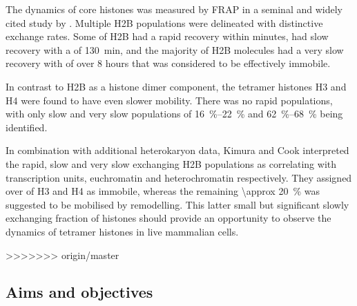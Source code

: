 
    The dynamics of core histones was measured by FRAP in a seminal
    and widely cited study by \citep{KimuraCook}.  Multiple H2B
    populations were delineated with distinctive exchange rates.  Some
     of H2B had a rapid recovery within minutes, 
    had slow recovery with a \halflife[] of \SI{130}{\minute}, and the
    majority of H2B molecules had a very slow recovery with \halflife[] of
    over 8 hours that was considered to be effectively immobile.

    In contrast to H2B as a histone dimer component, the tetramer
    histones H3 and H4 were found to have even slower mobility.  There
    was no rapid populations, with only slow and very slow populations
    of \SIrange{16}{22}{\percent} and \SIrange{62}{68}{\percent} being
    identified.

    In combination with additional heterokaryon data, Kimura and Cook
    interpreted the rapid, slow and very slow exchanging H2B
    populations as correlating with transcription units, euchromatin
    and heterochromatin respectively.  They assigned over 
    of H3 and H4 as immobile, whereas the remaining
    \SI{\approx 20}{\percent} was suggested to be mobilised by
    remodelling.  This latter small but significant 
    slowly exchanging fraction of histones 
    should provide an opportunity to observe the dynamics of
    tetramer histones in live mammalian cells.

>>>>>>> origin/master

  \subsection{Aims and objectives}

